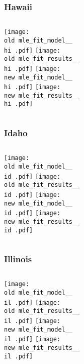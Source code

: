 \documentclass{beamer}
\newcommand{\old}{api-370-prod/pyseir/state_summaries/reports/}
\newcommand{\new}{new/pyseir/state_summaries/reports/}
\newcommand{\hi}{Hawaii__15}
\newcommand{\id}{Idaho__16}
\newcommand{\il}{Illinois__17}
\begin{document}
\begin{frame}
\frametitle{Hawaii}
    \begin{columns}[t]

       \texttt{[image: \\old mle\_fit\_model\_\_\\hi .pdf]}
       \texttt{[image: \\old mle\_fit\_results\_\_\\hi .pdf]}   
       \texttt{[image: \\new mle\_fit\_model\_\_\\hi .pdf]}
       \texttt{[image: \\new mle\_fit\_results\_\_\\hi .pdf]}   
       
\end{columns}
\end{frame}

\begin{frame}
\frametitle{Idaho}
    \begin{columns}[t]

       \texttt{[image: \\old mle\_fit\_model\_\_\\id .pdf]}
       \texttt{[image: \\old mle\_fit\_results\_\_\\id .pdf]}   
       \texttt{[image: \\new mle\_fit\_model\_\_\\id .pdf]}
       \texttt{[image: \\new mle\_fit\_results\_\_\\id .pdf]}   
       
\end{columns}
\end{frame}

\begin{frame}
\frametitle{Illinois}
    \begin{columns}[t]

       \texttt{[image: \\old mle\_fit\_model\_\_\\il .pdf]}
       \texttt{[image: \\old mle\_fit\_results\_\_\\il .pdf]}   
       \texttt{[image: \\new mle\_fit\_model\_\_\\il .pdf]}
       \texttt{[image: \\new mle\_fit\_results\_\_\\il .pdf]}   
       
\end{columns}
\end{frame}
\end{document}
